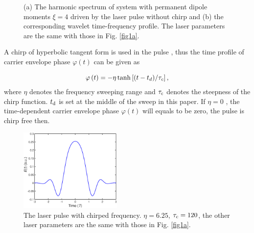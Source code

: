 \documentclass[10pt,letterpaper]{article}
\begin{document}
\begin{figure}[!htbp]
	\centering
	\hspace{-0.2in}
	\caption{(a) The harmonic spectrum of system with permanent dipole moments $ \xi=4 $ driven by the laser pulse without chirp and (b) the corresponding wavelet time-frequency profile. The laser parameters are the same with those in Fig. \ref{fig1a}.}
	\label{fig2}
\end{figure}

A chirp of hyperbolic tangent form is used in the pulse \cite{Carrera-Chirp-PRA-2007}, thus the time profile of carrier envelope phase $ \varphi(t) $  can be given as

\begin{equation}
\varphi \left( t \right) =  - \eta \tanh \left[ {{{\left( {t - {t_d}} \right)} \mathord{\left/
			{\vphantom {{\left( {t - {t_d}} \right)} {{\tau _c}}}} \right.
			\kern-\nulldelimiterspace} {{\tau _c}}}} \right],
\label{eq19}
\end{equation}
where $ \eta $  denotes the frequency sweeping range and $ \tau_{\rm{c}} $ denotes the steepness of the chirp function. $ t_{\rm{d}} $ is set at the middle of the sweep in this paper. If $ \eta=0 $ , the time-dependent carrier envelope phase $ \varphi(t) $  will equals to be zero, the pulse is chirp free then.

\begin{figure}[!htbp]
	\centering
	\includegraphics[width=0.45\textwidth]{fig3}
	\caption{The laser pulse with chirped frequency. $ \eta=6.25 $, $ \tau_{\rm{c}}=120 $, the other laser parameters are the same with those in Fig. \ref{fig1a}.}
	\label{fig3}
\end{figure}
\end{document}
